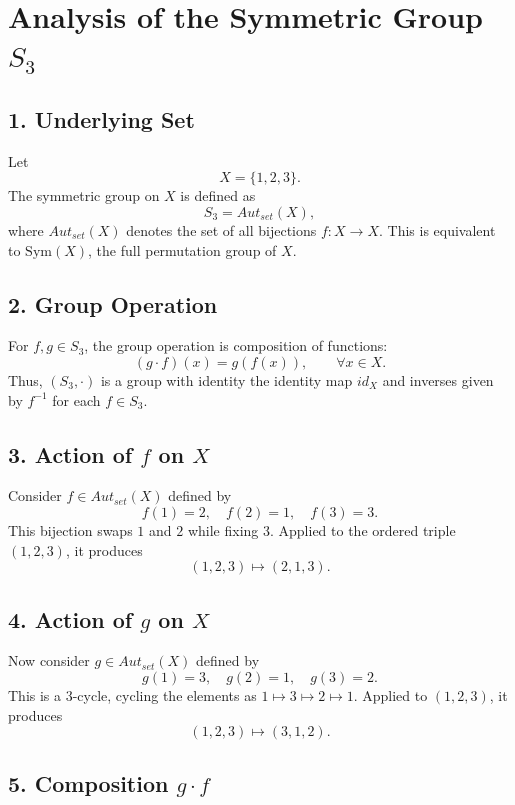\documentclass[12pt]{article}
\begin{document}
		
		\section*{Analysis of the Symmetric Group $S_3$}
		
		\subsection*{1. Underlying Set}
		
		Let 
		\[
		X = \{1,2,3\}.
		\]
		The symmetric group on $X$ is defined as
		\[
		S_3 = Aut_{set}(X),
		\]
		where $Aut_{set}(X)$ denotes the set of all bijections $f: X \to X$.  
		This is equivalent to $\mathrm{Sym}(X)$, the full permutation group of $X$.
		
		\subsection*{2. Group Operation}
		
		For $f,g \in S_3$, the group operation is composition of functions:
		\[
		(g \cdot f)(x) = g(f(x)), \qquad \forall x \in X.
		\]
		Thus, $(S_3,\cdot)$ is a group with identity the identity map $id_X$ and inverses given by $f^{-1}$ for each $f \in S_3$.
		
		\subsection*{3. Action of $f$ on $X$}
		
		Consider $f \in Aut_{set}(X)$ defined by
		\[
		f(1)=2, \quad f(2)=1, \quad f(3)=3.
		\]
		This bijection swaps $1$ and $2$ while fixing $3$.  
		Applied to the ordered triple $(1,2,3)$, it produces
		\[
		(1,2,3) \mapsto (2,1,3).
		\]
		
		\subsection*{4. Action of $g$ on $X$}
		
		Now consider $g \in Aut_{set}(X)$ defined by
		\[
		g(1)=3, \quad g(2)=1, \quad g(3)=2.
		\]
		This is a $3$-cycle, cycling the elements as $1 \mapsto 3 \mapsto 2 \mapsto 1$.  
		Applied to $(1,2,3)$, it produces
		\[
		(1,2,3) \mapsto (3,1,2).
		\]
		
		\subsection*{5. Composition $g \cdot f$}
		
\end{document}
